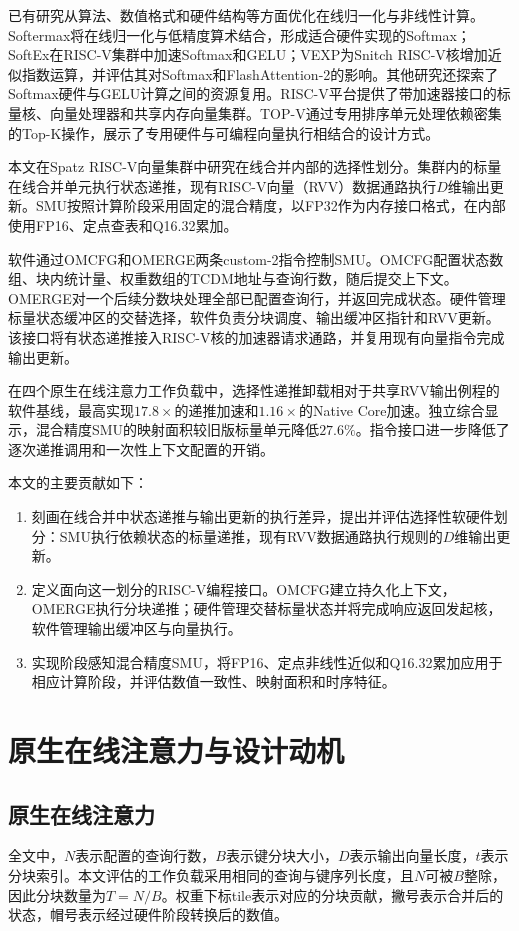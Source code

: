 \documentclass[journal]{IEEEtran}
\begin{document}
已有研究从算法、数值格式和硬件结构等方面优化在线归一化与非线性计算。Softermax将在线归一化与低精度算术结合，形成适合硬件实现的Softmax\cite{ref6}；SoftEx在RISC-V集群中加速Softmax和GELU\cite{ref7}；VEXP为Snitch RISC-V核增加近似指数运算，并评估其对Softmax和FlashAttention-2的影响\cite{ref8}。其他研究还探索了Softmax硬件与GELU计算之间的资源复用\cite{ref9}。RISC-V平台提供了带加速器接口的标量核\cite{ref10}、向量处理器\cite{ref11}和共享内存向量集群\cite{ref12}。TOP-V通过专用排序单元处理依赖密集的Top-K操作，展示了专用硬件与可编程向量执行相结合的设计方式\cite{ref13}。

本文在Spatz RISC-V向量集群中研究在线合并内部的选择性划分。集群内的标量在线合并单元执行状态递推，现有RISC-V向量（RVV）数据通路执行$D$维输出更新。SMU按照计算阶段采用固定的混合精度，以FP32作为内存接口格式，在内部使用FP16、定点查表和Q16.32累加。

软件通过OMCFG和OMERGE两条custom-2指令控制SMU。OMCFG配置状态数组、块内统计量、权重数组的TCDM地址与查询行数，随后提交上下文。OMERGE对一个后续分数块处理全部已配置查询行，并返回完成状态。硬件管理标量状态缓冲区的交替选择，软件负责分块调度、输出缓冲区指针和RVV更新。该接口将有状态递推接入RISC-V核的加速器请求通路，并复用现有向量指令完成输出更新。

在四个原生在线注意力工作负载中，选择性递推卸载相对于共享RVV输出例程的软件基线，最高实现$17.8\times$的递推加速和$1.16\times$的Native Core加速。独立综合显示，混合精度SMU的映射面积较旧版标量单元降低$27.6\%$。指令接口进一步降低了逐次递推调用和一次性上下文配置的开销。

本文的主要贡献如下：
\begin{enumerate}
\item 刻画在线合并中状态递推与输出更新的执行差异，提出并评估选择性软硬件划分：SMU执行依赖状态的标量递推，现有RVV数据通路执行规则的$D$维输出更新。
\item 定义面向这一划分的RISC-V编程接口。OMCFG建立持久化上下文，OMERGE执行分块递推；硬件管理交替标量状态并将完成响应返回发起核，软件管理输出缓冲区与向量执行。
\item 实现阶段感知混合精度SMU，将FP16、定点非线性近似和Q16.32累加应用于相应计算阶段，并评估数值一致性、映射面积和时序特征。
\end{enumerate}

\section{原生在线注意力与设计动机}
\subsection{原生在线注意力}
全文中，$N$表示配置的查询行数，$B$表示键分块大小，$D$表示输出向量长度，$t$表示分块索引。本文评估的工作负载采用相同的查询与键序列长度，且$N$可被$B$整除，因此分块数量为$T=N/B$。权重下标tile表示对应的分块贡献，撇号表示合并后的状态，帽号表示经过硬件阶段转换后的数值。
\end{document}
